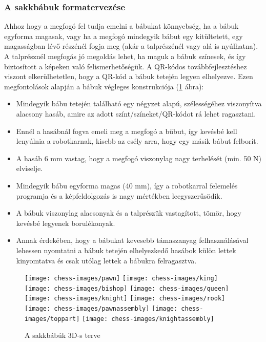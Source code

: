 \documentclass[../documentation.tex]{subfiles}
\begin{document}
\subsubsection{A sakkbábuk formatervezése}
Ahhoz hogy a megfogó fel tudja emelni a bábukat könnyebség, ha a bábuk egyforma magasak, vagy ha a megfogó mindegyik bábut egy kitültetett, egy magasságban lévő részénél fogja meg (akár a talprészénél vagy alá is nyúlhatna). A talprésznél megfogás jó megoldás lehet, ha maguk a bábuk színesek, és így biztosított a képeken való felismerhetőségük. A QR-kódos továbbfejlesztéshez viszont elkerülhetetlen, hogy a QR-kód a bábuk tetején legyen elhelyezve. Ezen megfontolások alapján a bábuk végleges konstrukciója (\ref{fig:chesspieces} ábra):
\begin{itemize}
	\item Mindegyik bábu tetején található egy négyzet alapú, szélességéhez viszonyítva alacsony hasáb, amire az adott színt/színeket/QR-kódot rá lehet ragasztani.
	\item Ennél a hasábnál fogva emeli meg a megfogó a bűbut, így kevésbé kell lenyúlnia a robotkarnak, kisebb az esély arra, hogy egy másik bábut felborít.
	\item A hasáb 6 mm vastag, hogy a megfogó viszonylag nagy terhelését (min. 50 N) elviselje.
	\item Mindegyik bábu egyforma magas (40 mm), így a robotkarral felemelés programja és a képfeldolgozás is nagy mértékben leegyszerűsödik.
	\item A bábuk viszonylag alacsonyak és a talprészük vastagított, tömör, hogy kevésbé legyenek borulékonyak.
	\item Annak érdekében, hogy a bábukat kevesebb támaszanyag felhasználásával lehessen nyomtatni a bábuk tetején elhelyezkedő hasábok külön lettek kinyomtatva és csak utólag lettek a bábukra felragasztva.
\end{itemize}

\begin{figure}
\centering
\texttt{[image: chess-images/pawn]}
\texttt{[image: chess-images/king]}
\texttt{[image: chess-images/bishop]}
\texttt{[image: chess-images/queen]}
\texttt{[image: chess-images/knight]}
\texttt{[image: chess-images/rook]}
\texttt{[image: chess-images/pawnassembly]}
\texttt{[image: chess-images/toppart]}
\texttt{[image: chess-images/knightassembly]}
\caption{A sakkbábúk 3D-s terve}
\label{fig:chesspieces}
\end{figure}
\end{document}
